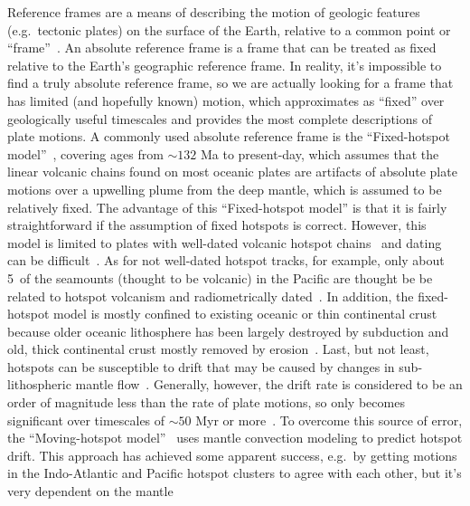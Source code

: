 Reference frames are a means of describing the motion of geologic features
(e.g.\ tectonic plates) on the surface of the Earth, relative to a common point
or ``frame''~\citep{Sh12}. An absolute reference frame is a frame that can be
treated as fixed relative to the Earth's geographic reference frame. In reality,
it's impossible to find a truly absolute reference frame, so we are actually
looking for a frame that has limited (and hopefully known) motion, which
approximates as ``fixed'' over geologically useful timescales and provides the
most complete descriptions of plate motions. A commonly used absolute reference
frame is the ``Fixed-hotspot model''~\citep{M93,M99}, covering ages from
${\sim}132$ Ma to present-day, which assumes that the linear volcanic chains
found on most oceanic plates are artifacts of absolute plate motions over a
upwelling plume from the deep mantle, which is assumed to be relatively fixed.
The advantage of this ``Fixed-hotspot model'' is that it is fairly
straightforward if the assumption of fixed hotspots is correct. However, this
model is limited to plates with well-dated volcanic hotspot chains~\citep[e.g.\
the Ninetyeast Ridge on the Indian Ocean floor and the Walvis Ridge in the
southern Atlantic Ocean, see][]{O05} and dating can be difficult~\citep[e.g.\
diffuse volcanic centers possibly related to large diameter plume conduits could
cause the existence of time reversals, see][]{O05}. As for not well-dated
hotspot tracks, for example, only about 5\textperthousand\ of the seamounts
(thought to be volcanic) in the Pacific are thought be be related to hotspot
volcanism and radiometrically dated~\citep[39 per cent of these ages are less
than 10 Ma, see][]{H07}. In addition, the fixed-hotspot model is mostly confined
to existing oceanic or thin continental crust because older oceanic lithosphere
has been largely destroyed by subduction and old, thick continental crust mostly
removed by erosion~\citep{C13}. Last, but not least, hotspots can be susceptible
to drift that may be caused by changes in sub-lithospheric mantle
flow~\citep{T09}. Generally, however, the drift rate is considered to be an
order of magnitude less than the rate of plate motions, so only becomes
significant over timescales of ${\sim}50$ Myr or more~\citep{O05,T07}. To
overcome this source of error, the ``Moving-hotspot model''~\citep{O05} uses
mantle convection modeling to predict hotspot drift. This approach has achieved
some apparent success, e.g.\ by getting motions in the Indo-Atlantic and Pacific
hotspot clusters to agree with each other, but it's very dependent on the mantle
